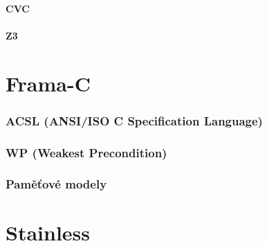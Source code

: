 \subsubsection{CVC}
\subsubsection{Z3}


%
%
%

\chapter{Frama-C}
\subsection{ACSL (ANSI/ISO C Specification Language)}
\subsection{WP (Weakest Precondition)}
\subsection{Paměťové modely}


\chapter{Stainless}

